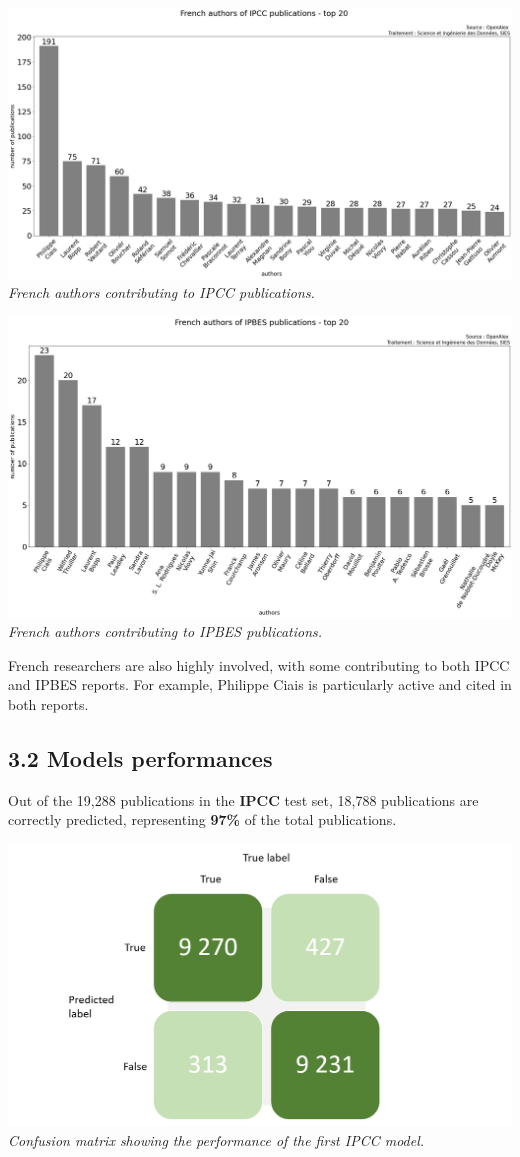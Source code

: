 \documentclass[
]{article}
\begin{document}
\includegraphics{./images/teds_ipcc_authors.png} \emph{French authors
contributing to IPCC publications.}

\includegraphics{./images/teds_ipbes_authors.png} \emph{French authors
contributing to IPBES publications.}

French researchers are also highly involved, with some contributing to
both IPCC and IPBES reports. For example, Philippe Ciais is particularly
active and cited in both reports.

\hypertarget{models-performances}{%
\subsection{3.2 Models performances}\label{models-performances}}

Out of the 19,288 publications in the \textbf{IPCC} test set, 18,788
publications are correctly predicted, representing \textbf{97\%} of the
total publications.

\includegraphics{./images/teds_ipcc_model.png} \emph{Confusion matrix
showing the performance of the first IPCC model.}
\end{document}
